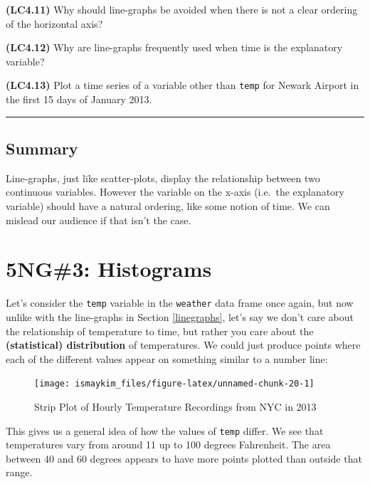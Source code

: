 \documentclass[]{tufte-book}
\let\oldrule=\rule
\renewcommand{\rule}[1]{\oldrule{\linewidth}}
\begin{document}
\textbf{(LC4.11)} Why should line-graphs be avoided when there is not a
clear ordering of the horizontal axis?

\textbf{(LC4.12)} Why are line-graphs frequently used when time is the
explanatory variable?

\textbf{(LC4.13)} Plot a time series of a variable other than
\texttt{temp} for Newark Airport in the first 15 days of January 2013.

\begin{center}\rule{0.5\linewidth}{\linethickness}\end{center}

\subsection{Summary}\label{summary-1}

Line-graphs, just like scatter-plots, display the relationship between
two continuous variables. However the variable on the x-axis (i.e.~the
explanatory variable) should have a natural ordering, like some notion
of time. We can mislead our audience if that isn't the case.

\section{5NG\#3: Histograms}\label{histograms}

Let's consider the \texttt{temp} variable in the \texttt{weather} data
frame once again, but now unlike with the line-graphs in Section
\ref{linegraphs}, let's say we don't care about the relationship of
temperature to time, but rather you care about the \textbf{(statistical)
distribution} of temperatures. We could just produce points where each
of the different values appear on something similar to a number line:

\begin{figure}

{\centering \texttt{[image: ismaykim\_files/figure-latex/unnamed-chunk-20-1]} 

}

\caption[Strip Plot of Hourly Temperature Recordings from NYC in 2013]{Strip Plot of Hourly Temperature Recordings from NYC in 2013}\label{fig:unnamed-chunk-20}
\end{figure}

This gives us a general idea of how the values of \texttt{temp} differ.
We see that temperatures vary from around 11 up to 100 degrees
Fahrenheit. The area between 40 and 60 degrees appears to have more
points plotted than outside that range.
\end{document}
